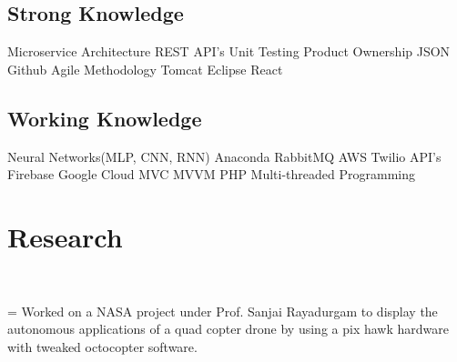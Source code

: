 \documentclass[]{rinkal_resume}
\begin{document}
\begin{minipage}[t]{0.30\textwidth}
\vspace{1pt}
\subsection{Strong Knowledge}
\vspace{1pt}
Microservice Architecture \textbullet{}
REST API's %
Unit Testing \textbullet{}
Product Ownership \textbullet{}
JSON \textbullet{}
Github \textbullet{}
Agile Methodology \textbullet{}
Tomcat \textbullet{}
Eclipse \textbullet{}
React %
\sectionsep

\vspace{1pt}
\subsection{Working Knowledge}
\vspace{1pt}
Neural Networks(MLP, CNN, RNN)  \textbullet{}
Anaconda \textbullet{}
RabbitMQ \textbullet{}
AWS \textbullet{}
Twilio API's \textbullet{}
Firebase \textbullet{}
Google Cloud \textbullet{} 
MVC \textbullet{}
MVVM \textbullet{}
PHP %
Multi-threaded Programming  %
\sectionsep


\section{Research}
 \\

\newlength\boxwid
\settowidth{\boxwid}{\indent\hspace{0.5cm}}

\hspace{0.2cm} \hangindent=\boxwid 
\textbullet{} Worked on a NASA project under Prof. Sanjai Rayadurgam to display the autonomous applications of a quad copter drone by using a pix hawk hardware with tweaked octocopter software. \\


\end{minipage}
\end{document}
